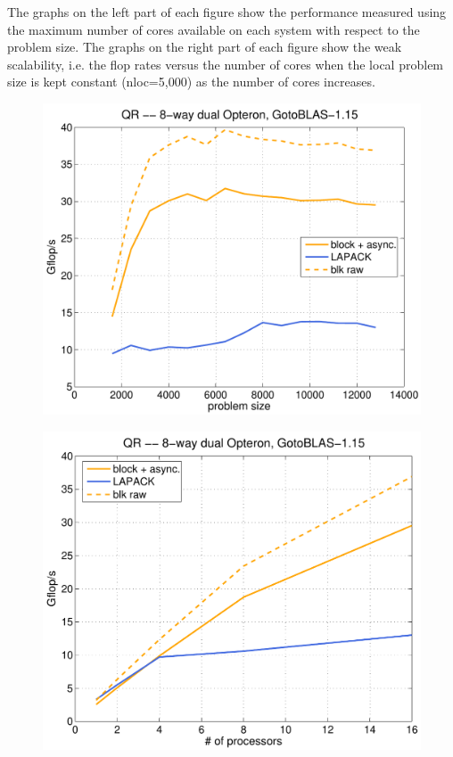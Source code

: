 \documentclass[runningheads]{llncs}
\begin{document}
The graphs on the left part of each figure show the performance
measured using the maximum number of cores available on each system
with respect to the problem size. The graphs on the right part of each
figure show the weak scalability, i.e. the flop rates versus the
number of cores when the local problem size is kept constant
(nloc=5,000) as the number of cores increases.


\begin{figure}
\begin{minipage}[tl]{0.5\textwidth}
\begin{center}
{\includegraphics[width=1\textwidth]{images/goto_opt_16.pdf}}
\end{center}
\end{minipage}
\hspace{0.25cm}
\begin{minipage}[tr]{0.5\textwidth}
\begin{center}
{\includegraphics[width=1\textwidth]{images/goto_opt_scal.pdf}}

\end{center}
\end{minipage}
\end{figure}
\end{document}

